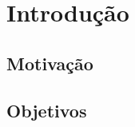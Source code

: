 
\chapter*[Introdução]{Introdução}
%


%

\section*{Motivação}\label{sec:motivacao}
\lipsum[10]

\section*{Objetivos}\label{sec:objetivos}
\lipsum[10]
